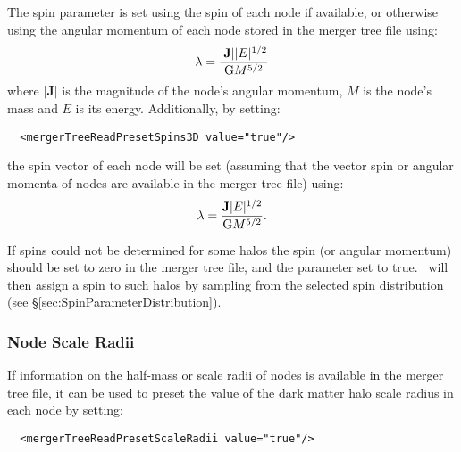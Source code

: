 The spin parameter is set using the spin of each node if available, or otherwise using the angular momentum of each node stored in the merger tree file using:
\begin{equation}
 \lambda = {|{\mathbf J}| |E|^{1/2} \over {\mathrm G} M^{5/2}}
\end{equation}
where $|{\mathbf J}|$ is the magnitude of the node's angular momentum, $M$ is the node's mass and $E$ is its energy. Additionally, by setting:

\begin{verbatim}
  <mergerTreeReadPresetSpins3D value="true"/>
\end{verbatim}
the spin vector of each node will be set (assuming that the vector spin or angular momenta of nodes are available in the merger tree file) using:
\begin{equation}
 {\mathbf \lambda} = {{\mathbf J} |E|^{1/2} \over {\mathrm G} M^{5/2}}.
\end{equation}

If spins could not be determined for some halos the spin (or angular momentum) should be set to zero in the merger tree file, and the parameter {\normalfont \ttfamily [mergerTreeReadPresetUnphysicalSpins]} set to {\normalfont \ttfamily true}. \glc\ will then assign a spin to such halos by sampling from the selected spin distribution (see \S\ref{sec:SpinParameterDistribution}). 

\subsubsection{Node Scale Radii}

If information on the half-mass or scale radii of nodes is available in the merger tree file, it can be used to preset the value of the dark matter halo scale radius in each node by setting:

\begin{verbatim}
  <mergerTreeReadPresetScaleRadii value="true"/>
\end{verbatim}

